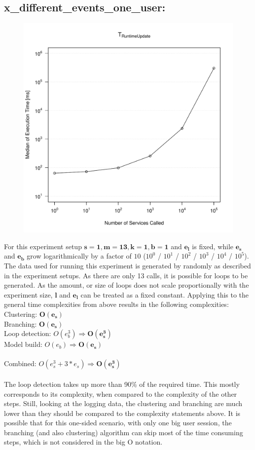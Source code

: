 \documentclass[10pt,a4paper]{article}
\begin{document}
	\subsection{x\_different\_events\_one\_user:}
	\begin{figure}[H]
		\centering
		\includegraphics[scale=0.7]{graphics/TRuntimeUpdate_median_different_events.pdf}
	\end{figure}
	For this experiment setup $\mathbf{s = 1, m = 13, k = 1, b = 1}$ and $\mathbf{e_l}$ is fixed, while $\mathbf{e_s}$ and $\mathbf{e_b}$ grow logarithmically by a factor of $10$ ($10^0$ / $10^1$ / $10^2$ / $10^3$ / $10^4$ / $10^5$). The data used for running this experiment is generated by randomly as described in the experiment setups. As there are only 13 calls, it is possible for loops to be generated. As the amount, or size of loops does not scale proportionally with the experiment size, $\mathbf{l}$ and $\mathbf{e_l}$ can be treated as a fixed constant. Applying this to the general time complexities from above results in the following complexities:\\
	Clustering: $\mathbf{O(e_s)}$\\
	Branching: $\mathbf{O(e_s)}$\\
	Loop detection: $O(e_b^3) \Rightarrow \mathbf{O(e_s^3)}$\\
	Model build: $O(e_b) \Rightarrow \mathbf{O(e_s)}$\\
	\\
	Combined: $O(e_s^3 + 3*e_s) \Rightarrow \mathbf{O(e_s^3)}$\\
	\\
	The loop detection takes up more than 90\% of the required time. This mostly corresponds to its complexity, when compared to the complexity of the other steps. Still, looking at the logging data, the clustering and branching are much lower than they should be compared to the complexity statements above. It is possible that for this one-sided scenario, with only one big user session, the branching (and also clustering) algorithm can skip most of the time consuming steps, which is not considered in the big O notation.
\end{document}
